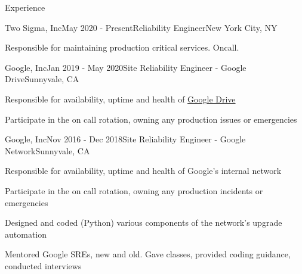 \documentclass{resume}
\begin{document}
  \begin{rSection}{Experience}
    \begin{rSubsection}{Two Sigma, Inc}{May 2020 - Present}{Reliability Engineer}{New York City, NY}
      \item Responsible for maintaining production critical services. Oncall.
    \end{rSubsection}

    \begin{rSubsection}{Google, Inc}{Jan 2019 - May 2020}{Site Reliability Engineer - Google Drive}{Sunnyvale, CA}
      \item Responsible for availability, uptime and health of \href{https://drive.google.com}{Google Drive}
      \item Participate in the on call rotation, owning any production issues or emergencies
    \end{rSubsection}

    \begin{rSubsection}{Google, Inc}{Nov 2016 - Dec 2018}{Site Reliability Engineer - Google Network}{Sunnyvale, CA}
      \item Responsible for availability, uptime and health of Google's internal network
      \item Participate in the on call rotation, owning any production incidents or emergencies
      \item Designed and coded (Python) various components of the network's upgrade automation
      \item Mentored Google SREs, new and old. Gave classes, provided coding guidance, conducted interviews
    \end{rSubsection}

    \begin{comment}
      \begin{rSubsection}{Machine Zone, Inc}{Jul 2016 - Oct 2016}{Senior Site Reliability Engineer}{Palo Alto, CA}
        \item Team lead, responsible for creating and enforcing SRE policies
        \item On call, responding to pages and maintaining production reliability of all of MZ's production systems
        \item Identify pain points and take lead in engineering solutions, removing the pain
        \item Define problems, organizing and assisting others to allow them to create solutions
        \item Change procedures and process based on what isn't working well and working with others to improve the status quo
        \item Work with Puppet, Foreman, Salt, Nginx, ELK and many more technologies
      \end{rSubsection}
    \end{comment}


\end{rSection}
\end{document}
